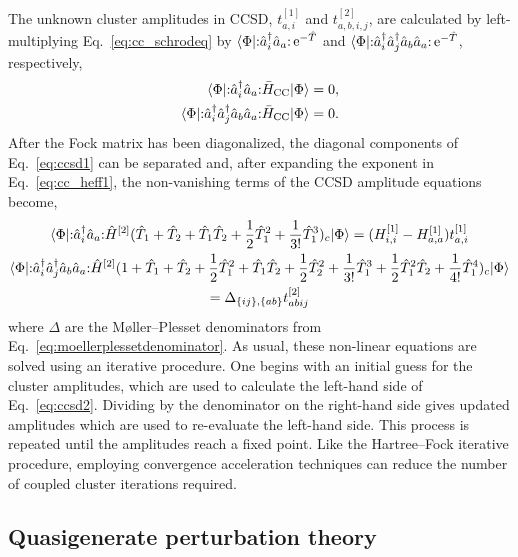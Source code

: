 The unknown cluster amplitudes in CCSD, $t_{a, i}^{[1]}$ and $t_{a, b,
i, j}^{[2]}$, are calculated by left-multiplying
Eq.~\eqref{eq:cc_schrodeq} by $\langle \Phi | \mathopen: \hat
a_{i}^\dagger \hat a_{a} \mathclose: \operatorname{e}^{-\hat{T}}$ and $\langle \Phi | \mathopen: \hat
a_{i}^\dagger \hat a_{j}^\dagger \hat a_{b} \hat
a_{a} \mathclose: \operatorname{e}^{-\hat{T}}$, respectively,
\begin{align} \label{eq:ccsd1}
  \langle \Phi | \mathopen: \hat a_{i}^\dagger \hat a_{a} \mathclose: \bar{H}_{\mathrm{CC}} | \Phi \rangle &= 0, \\
  \langle \Phi | \mathopen: \hat a_{i}^\dagger \hat a_{j}^\dagger \hat a_{b} \hat a_{a} \mathclose:\bar{H}_{\mathrm{CC}} | \Phi \rangle &= 0. \notag
\end{align}
After the Fock matrix has been diagonalized, the diagonal components
of Eq.~\eqref{eq:ccsd1} can be separated and, after expanding the
exponent in Eq.~\eqref{eq:cc_heff1}, the non-vanishing terms of the
CCSD amplitude equations become,
\begin{gather} \label{eq:ccsd2}
  \langle \Phi | \mathopen: \hat a_{i}^\dagger \hat a_{a} \mathclose: \hat{H}^{[2]}(\hat{T}_{1} + \hat{T}_{2} + \hat{T}_{1}\hat{T}_{2} + \frac{1}{2}\hat{T}_{1}^{2} + \frac{1}{3!}\hat{T}_{1}^{3})_{c} | \Phi \rangle = (H_{i, i}^{[1]} - H_{a, a}^{[1]}) t_{a, i}^{[1]} \\
  \langle \Phi | \mathopen: \hat a_{i}^\dagger \hat a_{j}^\dagger \hat a_{b} \hat a_{a} \mathclose: \hat{H}^{[2]} (1 + \hat{T}_{1} + \hat{T}_{2} + \frac{1}{2} \hat{T}_{1}^{2} + \hat{T}_{1}\hat{T}_{2} + \frac{1}{2}\hat{T}_{2}^{2} + \frac{1}{3!}\hat{T}_{1}^{3} + \frac{1}{2}\hat{T}_{1}^{2}\hat{T}_{2} + \frac{1}{4!}\hat{T}_{1}^{4} )_{c} | \Phi \rangle \notag \\
= \Delta_{\{ij\}, \{ab\}} t_{abij}^{[2]} \notag
\end{gather}
where $\Delta$ are the M\o ller--Plesset denominators from
Eq.~\eqref{eq:moellerplessetdenominator}.  As usual, these non-linear
equations are solved using an iterative procedure.  One begins with an
initial guess for the cluster amplitudes, which are used to calculate
the left-hand side of Eq.~\eqref{eq:ccsd2}.  Dividing by the
denominator on the right-hand side gives updated amplitudes which are
used to re-evaluate the left-hand side. This process is repeated until
the amplitudes reach a fixed point.  Like the Hartree--Fock iterative
procedure, employing convergence acceleration techniques can reduce
the number of coupled cluster iterations required.

\subsection{Quasigenerate perturbation theory}
\label{subsec:selfenergy}

